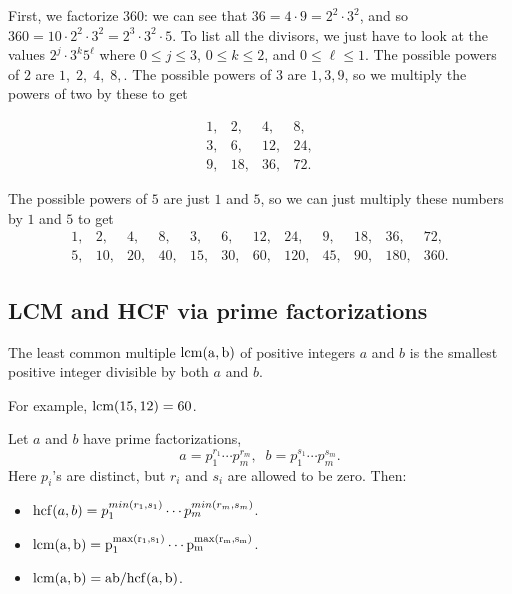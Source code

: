 \documentclass[11pt,dvipsnames]{book}
\def\hcf{{\rm hcf}}
\numberwithin{equation}{section} %
\numberwithin{figure}{section} %
\numberwithin{table}{section} %
\begin{document}
First, we factorize $360$: we can see that $36=4\cdot 9=2^2\cdot 3^2$, and so $360 = 10\cdot 2^2\cdot 3^2 = 2^3\cdot 3^2\cdot 5$. To list all the divisors, we just have to look at the values $2^j\cdot 3^{k}5^{\ell}$ where $0\leq j\leq 3$, $0\leq k\leq 2$, and $0\leq \ell\leq 1$. The possible powers of $2$ are $1, \; 2, \; 4, \; 8,$. The possible powers of $3$ are $1,3,9$, so we multiply the powers of two by these to get 

\[
\begin{array}{cccc}
1, &  2, &  4, &  8, \\
3, & 6, &  12, &  24, \\
 9, &  18, &  36, &  72.
 \end{array}
 \]
 
 The possible powers of $5$ are just $1$ and $5$, so we can just multiply these numbers by $1$ and $5$ to get 
 \[
 \begin{array}{cccccccccccc}
1, &  2, &  4, &  8, 
& 3, & 6, &  12, &  24, 
&  9, &  18, &  36, &  72, \\ 
5, &  10, &  20, &  40,
& 15, & 30, & 60,  &  120, 
&  45, &  90, &  180, &  360. 
 \end{array}
 \]


\subsection{LCM and HCF via prime factorizations}


\def\lcm{\rm lcm}
\begin{definition}
The least common multiple $\lcm(a,b)$ of positive integers $a$ and $b$ is the smallest positive integer divisible by both $a$ and $b$.   
\end{definition}

For example, $\lcm(15,12)=60$.

 \begin{theorem}
 \label{t:lcm}
Let $a$ and $b$ have prime factorizations,
$$a=p_1^{r_1}\cdots p_m^{r_m}, \;\; b=p_1^{s_1}\cdots p_m^{s_m}.$$  Here $p_i$'s are distinct, but $r_i$ and $s_i$ are allowed to be zero.  Then:
\begin{itemize}
 \item $\hcf(a,b) = p_1^{min(r_1,s_1)}\cdots p_m^{min(r_m,s_m)}$.
 \item $\lcm(a,b) = p_1^{max(r_1,s_1)}\cdots p_m^{max(r_m,s_m)}$.
 \item $\lcm(a,b) = ab/\hcf(a,b)$.
\end{itemize}
\end{theorem}
\end{document}
